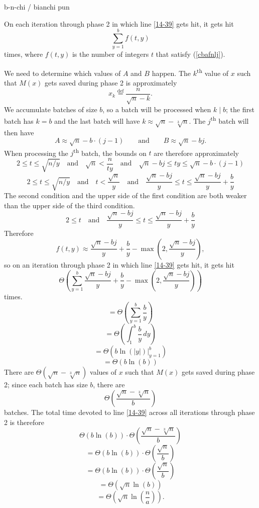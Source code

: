 \documentclass[12pt]{article}
\newcommand{\eqn}[1]{\begin{displaymath} #1 \end{displaymath}}
\newcommand{\neqn}[1]{\begin{equation} #1 \end{equation}}
\newcommand{\integral}[4]{\displaystyle\int_{#3}^{#4} \! #1 \, d#2}
\newcommand{\abs}[1]{\left\vert #1 \right\vert}
\newcommand{\eval}[3]{\left. #1 \right|_{#2}^{#3}}
\newcommand{\defeq}[0]{\overset{\mathrm{def}}{=}}
\newcommand{\quadtext}[1]{\quad \text{#1} \quad}
\newcommand{\qquadtext}[1]{\qquad \text{#1} \qquad}
\begin{document}
\todo b-n-chi / bianchi pun

On each iteration through phase 2 in which line \ref{14-39} gets hit, it gets hit
\eqn{\sum_{y=1}^b f(t,y)}
times, where $f(t,y)$ is the number of integers $t$ that satisfy (\ref{cbafnlj}).

We need to determine which values of $A$ and $B$ happen.  The $k$\textsuperscript{th} value of $x$ such that $M(x)$ gets saved during phase 2 is approximately
\eqn{x_k \defeq \frac{n}{\sqrt{n} - k}.}
We accumulate batches of size $b$, so a batch will be processed when $k \mid b$; the first batch has $k=b$ and the last batch will have $k \approx \sqrt{n} - \sqrt[3]{n}$.  The $j$\textsuperscript{th} batch will then have
\eqn{A \approx \sqrt{n} - b \cdot (j-1) \qquadtext{and} B \approx \sqrt{n} - bj.}
When processing the $j$\textsuperscript{th} batch, the bounds on $t$ are therefore approximately
\eqn{2 \leq t \leq \sqrt{n/y} \quadtext{and} \sqrt{n} < \frac{n}{ty} \quadtext{and} \sqrt{n}-bj \leq ty \leq \sqrt{n}-b\cdot(j-1)}
\eqn{2 \leq t \leq \sqrt{n/y} \quadtext{and} t < \frac{\sqrt{n}}{y} \quadtext{and} \frac{\sqrt{n}-bj}{y} \leq t \leq \frac{\sqrt{n}-bj}{y}+\frac{b}{y}}
The second condition and the upper side of the first condition are both weaker than the upper side of the third condition.
\eqn{2 \leq t \quadtext{and} \frac{\sqrt{n}-bj}{y} \leq t \leq \frac{\sqrt{n}-bj}{y}+\frac{b}{y}}
Therefore
\eqn{f(t,y) \approx \frac{\sqrt{n}-bj}{y}+\frac{b}{y} - \max\left(2, \frac{\sqrt{n}-bj}{y}\right),}
so on an iteration through phase 2 in which line \ref{14-39} gets hit, it gets hit
\eqn{\Theta\left(\sum_{y=1}^b \frac{\sqrt{n}-bj}{y}+\frac{b}{y} - \max\left(2, \frac{\sqrt{n}-bj}{y}\right)\right)}
times.
\eqn{= \Theta\left( \sum_{y=1}^b \frac{b}{y} \right)}
\eqn{= \Theta\left( \integral{\frac{b}{y}}{y}{1}{b} \right)}
\eqn{= \Theta\left( \eval{b\ln(\abs{y})}{y=1}{b} \right)}
\eqn{= \Theta\left( b \ln(b) \right)}
There are $\Theta(\sqrt{n}-\sqrt[3]{n})$ values of $x$ such that $M(x)$ gets saved during phase 2; since each batch has size $b$, there are
\eqn{\Theta\left( \frac{\sqrt{n}-\sqrt[3]{n}}{b} \right)}
batches.  The total time devoted to line \ref{14-39} across all iterations through phase 2 is therefore
\eqn{\Theta\left( b \ln(b) \right) \cdot \Theta\left( \frac{\sqrt{n}-\sqrt[3]{n}}{b} \right)}
\eqn{= \Theta\left( b \ln(b) \right) \cdot \Theta\left( \frac{\sqrt{n}}{b} \right)}
\eqn{= \Theta\left( b \ln(b) \right) \cdot \Theta\left( \frac{\sqrt{n}}{b} \right)}
\eqn{= \Theta\left( \sqrt{n} \ln(b) \right)}
\neqn{= \Theta\left( \sqrt{n} \ln\left(\frac{n}{a}\right) \right). \label{14-39-time}}
\end{document}
